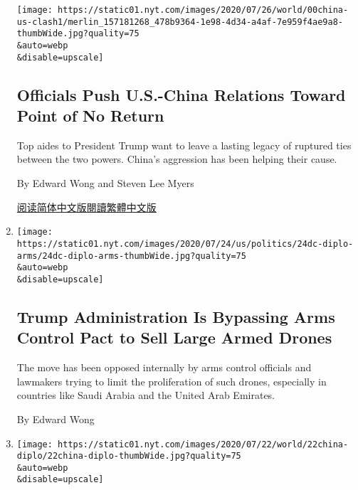 \begin{enumerate}
  \texttt{[image: https://static01.nyt.com/images/2020/07/26/world/00china-us-clash1/merlin\_157181268\_478b9364-1e98-4d34-a4af-7e959f4ae9a8-thumbWide.jpg?quality=75\\\&auto=webp\\\&disable=upscale]}

  \hypertarget{officials-push-us-china-relations-toward-point-of-no-return}{%
  \subsection{Officials Push U.S.-China Relations Toward Point of No
  Return}\label{officials-push-us-china-relations-toward-point-of-no-return}}

  Top aides to President Trump want to leave a lasting legacy of
  ruptured ties between the two powers. China's aggression has been
  helping their cause.

  By Edward Wong and Steven Lee Myers

  \href{https://cn.nytimes.com/china/20200727/us-china-trump-xi/}{阅读简体中文版}\href{https://cn.nytimes.com/china/20200727/us-china-trump-xi/zh-hant/}{閱讀繁體中文版}
\item
  \href{/2020/07/24/us/politics/trump-arms-sales-drones.html}{}

  \texttt{[image: https://static01.nyt.com/images/2020/07/24/us/politics/24dc-diplo-arms/24dc-diplo-arms-thumbWide.jpg?quality=75\\\&auto=webp\\\&disable=upscale]}

  \hypertarget{trump-administration-is-bypassing-arms-control-pact-to-sell-large-armed-drones}{%
  \subsection{Trump Administration Is Bypassing Arms Control Pact to
  Sell Large Armed
  Drones}\label{trump-administration-is-bypassing-arms-control-pact-to-sell-large-armed-drones}}

  The move has been opposed internally by arms control officials and
  lawmakers trying to limit the proliferation of such drones, especially
  in countries like Saudi Arabia and the United Arab Emirates.

  By Edward Wong
\item
  \href{/2020/07/22/world/asia/us-china-houston-consulate.html}{}

  \texttt{[image: https://static01.nyt.com/images/2020/07/22/world/22china-diplo/22china-diplo-thumbWide.jpg?quality=75\\\&auto=webp\\\&disable=upscale]}

  \hypertarget{us-orders-china-to-close-houston-consulate-citing-efforts-to-steal-trade-secrets}{%
}
\end{enumerate}
